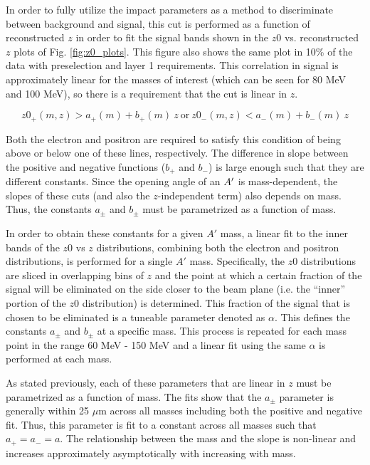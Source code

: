 In order to fully utilize the impact parameters as a method to discriminate between background and signal, this cut is performed as a function of reconstructed $z$ in order to fit the signal bands shown in the $z0$ vs. reconstructed $z$ plots of Fig. \ref{fig:z0_plots}. This figure also shows the same plot in 10\% of the data with preselection and layer 1 requirements. This correlation in signal is approximately linear for the masses of interest (which can be seen for 80 MeV and 100 MeV), so there is a requirement that the cut is linear in $z$.

\begin{equation}
    z0_+(m,z) > a_{+}(m) + b_{+}(m) \ z \ \mathrm{or} \
    z0_-(m,z) < a_{-}(m) + b_{-}(m) \ z 
    \label{equ:z0_cut}
\end{equation}

Both the electron and positron are required to satisfy this condition of being above or below one of these lines, respectively. The difference in slope between the positive and negative functions ($b_{+}$ and $b_{-}$) is large enough such that they are different constants. Since the opening angle of an $A^\prime$ is mass-dependent, the slopes of these cuts (and also the $z$-independent term) also depends on mass. Thus, the constants $a_{\pm}$ and  $b_{\pm}$ must be parametrized as a function of mass.

In order to obtain these constants for a given $A'$ mass, a linear fit to the inner bands of the $z0$ vs $z$ distributions, combining both the electron and positron distributions, is performed for a single $A'$ mass. Specifically, the $z0$ distributions are sliced in overlapping bins of $z$ and the point at which a certain fraction of the signal will be eliminated on the side closer to the beam plane (i.e. the ``inner'' portion of the $z0$ distribution) is determined. This fraction of the signal that is chosen to be eliminated is a tuneable parameter denoted as $\alpha$. This defines the constants $a_{\pm}$ and $b_{\pm}$ at a specific mass. This process is repeated for each mass point in the range 60 MeV - 150 MeV and a linear fit using the same $\alpha$ is performed at each mass. 

As stated previously, each of these parameters that are linear in $z$ must be parametrized as a function of mass. The fits show that the $a_{\pm}$ parameter is generally within 25 $\mu$m across all masses including both the positive and negative fit. Thus, this parameter is fit to a constant across all masses such that $a_{+}=a_{-}=a$. The relationship between the mass and the slope is non-linear and increases approximately asymptotically with increasing with mass.

